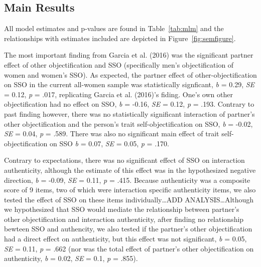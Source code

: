 \documentclass[man]{apa6}
\begin{document}
\subsection{Main Results}\label{main-results}

All model estimates and p-values are found in Table~\ref{tab:mlm} and
the relationships with estimates included are depicted in
Figure~\ref{fig:semfigure}.

The most important finding from Garcia et al. (2016) was the significant
partner effect of other objectification and SSO (specifically men's
objectification of women and women's SSO). As expected, the partner
effect of other-objectification on SSO in the current all-women sample
was statistically signficant, \emph{b} = 0.29, \emph{SE} = 0.12,
\emph{p} = .017, replicating Garcia et al. (2016)'s fiding. One's own
other objectification had no effect on SSO, \emph{b} = -0.16, \emph{SE}
= 0.12, \emph{p} = .193. Contrary to past finding however, there was no
statistically significant interaction of partner's other objectification
and the person's trait self-objectification on SSO, \emph{b} = -0.02,
\emph{SE} = 0.04, \emph{p} = .589. There was also no significant main
effect of trait self-objectification on SSO \emph{b} = 0.07, \emph{SE} =
0.05, \emph{p} = .170.

Contrary to expectations, there was no significant effect of SSO on
interaction authenticity, although the estimate of this effect was in
the hypothesized negative direction, \emph{b} = -0.09, \emph{SE} = 0.11,
\emph{p} = .415. Because authenticity was a composite score of 9 items,
two of which were interaction specific authenticity items, we also
tested the effect of SSO on these items individually\ldots{}ADD
ANALYSIS\ldots{}Although we hypothesized that SSO would mediate the
relationship between partner's other objectification and interaction
authenticity, after finding no relationship bewteen SSO and authencity,
we also tested if the partner's other objectification had a direct
effect on authenticity, but this effect was not significant, \emph{b} =
0.05, \emph{SE} = 0.11, \emph{p} = .662 (nor was the total effect of
partner's other objectification on authenticity, \emph{b} = 0.02,
\emph{SE} = 0.1, \emph{p} = .855).
\end{document}
